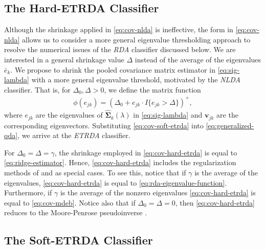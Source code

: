 \documentclass[11pt]{article}
\begin{document}
\subsection{The Hard-ETRDA Classifier}


Although the shrinkage applied in \eqref{eq:cov-nlda} is ineffective, the form in \eqref{eq:cov-nlda} allows us to consider a more general eigenvalue thresholding approach to resolve the numerical issues of the \emph{RDA} classifier discussed below. We are interested in a general shrinkage value $\Delta$ instead of the average of the eigenvalues $\bar{e}_k$. We propose to shrink the pooled covariance matrix estimator in \eqref{eq:sig-lambda} with a more general eigenvalue threshold, motivated by the \emph{NLDA} classifier. That is, for $\Delta_0, \Delta > 0$, we define the matrix function
\begin{align}
	\phi(e_{jk}) = (\Delta_0 + e_{jk} \cdot I\{e_{jk} > \Delta\} )^{+},\label{eq:cov-hard-etrda}
\end{align}
where $e_{jk}$ are the eigenvalues of $\widehat{\bm \Sigma}_k(\lambda)$ in \eqref{eq:sig-lambda} and $\bm v_{jk}$ are the corresponding eigenvectors. Substituting \eqref{eq:cov-soft-etrda} into \eqref{eq:generalized-qda}, we arrive at the \emph{ETRDA} classifier.

For $\Delta_0 = \Delta = \gamma$, the shrinkage employed in \eqref{eq:cov-hard-etrda} is equal to \eqref{eq:ridge-estimator}. Hence, \eqref{eq:cov-hard-etrda} includes the regularization methods of \cite{Friedman:1989tm} and \cite{Srivastava:2007ww} as special cases. To see this, notice that if $\gamma$ is the average of the eigenvalues, \eqref{eq:cov-hard-etrda} is equal to \eqref{eq:rda-eigenvalue-function}. Furthermore, if $\gamma$ is the average of the nonzero eigenvalues \eqref{eq:cov-hard-etrda} is equal to \eqref{eq:cov-mdeb}. Notice also that if $\Delta_0 = \Delta = 0$, then \eqref{eq:cov-hard-etrda} reduces to the Moore-Penrose pseudoinverse \citep{Harville:2008wja}.


\subsection{The Soft-ETRDA Classifier}
\end{document}
